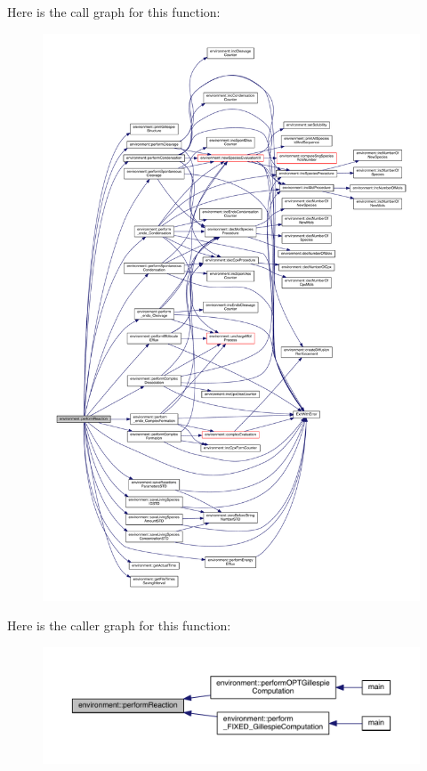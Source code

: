 Here is the call graph for this function\-:
\nopagebreak
\begin{figure}[H]
\begin{center}
\leavevmode
\includegraphics[width=350pt]{a00014_a1db4e67ba458a54f4fab3e10a203765c_cgraph}
\end{center}
\end{figure}




Here is the caller graph for this function\-:
\nopagebreak
\begin{figure}[H]
\begin{center}
\leavevmode
\includegraphics[width=350pt]{a00014_a1db4e67ba458a54f4fab3e10a203765c_icgraph}
\end{center}
\end{figure}


